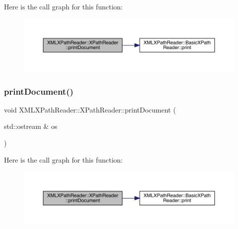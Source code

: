 Here is the call graph for this function\+:
\nopagebreak
\begin{figure}[H]
\begin{center}
\leavevmode
\includegraphics[width=350pt]{d3/d5a/classXMLXPathReader_1_1XPathReader_a5505bd1ad902828907e2562947719fef_cgraph}
\end{center}
\end{figure}
\mbox{\label{classXMLXPathReader_1_1XPathReader_a5505bd1ad902828907e2562947719fef}} 
\subsubsection{\texorpdfstring{printDocument()}{printDocument()}\hspace{0.1cm}{\footnotesize\ttfamily [3/3]}}
{\footnotesize\ttfamily void X\+M\+L\+X\+Path\+Reader\+::\+X\+Path\+Reader\+::print\+Document (\begin{DoxyParamCaption}\item[{std\+::ostream \&}]{os }\end{DoxyParamCaption})\hspace{0.3cm}{\ttfamily [inline]}}

Here is the call graph for this function\+:
\nopagebreak
\begin{figure}[H]
\begin{center}
\leavevmode
\includegraphics[width=350pt]{d3/d5a/classXMLXPathReader_1_1XPathReader_a5505bd1ad902828907e2562947719fef_cgraph}
\end{center}
\end{figure}
\mbox{\label{classXMLXPathReader_1_1XPathReader_a9634a8955fc1b2c8bc086b95f7fa2c1f}} 

